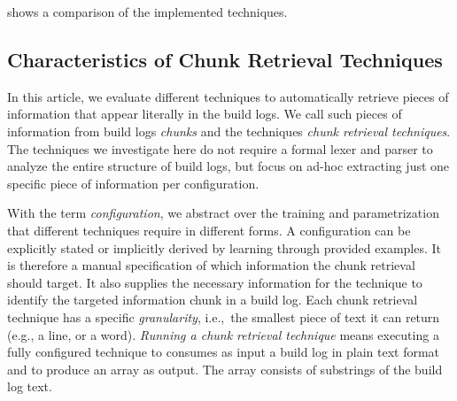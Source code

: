  shows a comparison of the implemented techniques.


\subsection{Characteristics of Chunk Retrieval Techniques}
\label{sec:crt-characteristics}
In this article, we evaluate different techniques to automatically
retrieve pieces of information that appear literally in the build
logs.
We call such pieces of information from build logs
\emph{chunks} and the techniques \emph{chunk retrieval techniques}.
The techniques we investigate here do not require a formal lexer and
parser to analyze the entire structure of build logs, but focus on
ad-hoc extracting just one specific piece of information per
configuration.

With the term \textit{configuration}, we abstract over the training
and parametrization that different techniques require in different
forms.
A configuration can be explicitly stated or implicitly derived
by learning through provided examples.
It is therefore a manual
specification of which information the chunk retrieval should target.
It also supplies the necessary information for the technique to
identify the targeted information chunk in a build log.
Each chunk
retrieval technique has a specific \textit{granularity}, i.e.,\ the
smallest piece of text it can return (e.g., a line, or a word).
\emph{Running a
chunk retrieval technique} means executing a fully configured
technique to consumes as input a build log in plain text format and to
produce an array as output.
The array consists of substrings of the
build log text.

